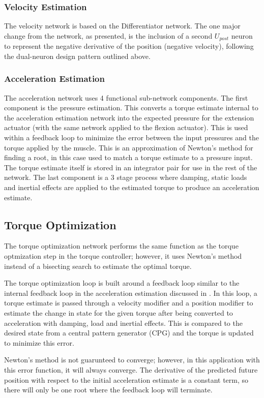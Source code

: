 \documentclass[letterpaper, 10 pt, conference]{IEEEconf} %
\newcommand{\myref}[1]{\hyperref[#1]{\Cref{#1}}}
\newcommand{\bbss}[1]{\subsection{#1}}
\newcommand{\bbsss}[1]{\subsubsection{#1}}
\begin{document}
\bbsss{Velocity Estimation}

The velocity network is based on the Differentiator network. 
The one major change from the network,
as presented, is the inclusion of a second $U_{post}$ neuron to 
represent the negative derivative of the position (negative velocity), following the dual-neuron design pattern outlined above.

\bbsss{Acceleration Estimation}
\label{sec:accelerationEstimation}

The acceleration network uses 4 functional sub-network components. The first component is the pressure estimation. This converts a torque estimate internal to the acceleration estimation network into the expected pressure for the extension actuator (with the same network applied to the flexion actuator). This is used within a feedback loop to minimize the error between the input pressures and the torque applied by the muscle. This is an approximation of Newton's method for finding a root, in this case used to match a torque estimate to a pressure input. The torque estimate itself is stored in an integrator pair for use in the rest of the network. The last component is a 3 stage process where damping, static loads and inertial effects are applied to the estimated torque to produce an acceleration estimate.

\bbss{Torque Optimization}

The torque optimization network performs the same function as the torque optmization step in the torque controller; however, it uses Newton's method instead of a bisecting search to estimate the optimal torque.

The torque optimization loop is built around a feedback loop similar to the internal feedback loop in the acceleration estimation discussed in \myref{sec:accelerationEstimation}. In this loop, a torque estimate is passed through a velocity modifier and a position modifier to estimate the change in state for the given torque after being converted to acceleration with damping, load and inertial effects. This is compared to the desired state from a central pattern generator (CPG) and the torque is updated to minimize this error.

Newton's method is not guarunteed to converge; however, in this application with this error function, it will always converge. The derivative of the predicted future position with respect to the initial acceleration estimate is a constant term, so there will only be one root where the feedback loop will terminate.
\end{document}
